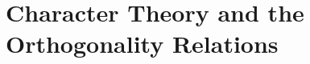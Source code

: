 \chapter{Character Theory and the Orthogonality Relations}

\begin{exercise}
    \td 
\end{exercise}